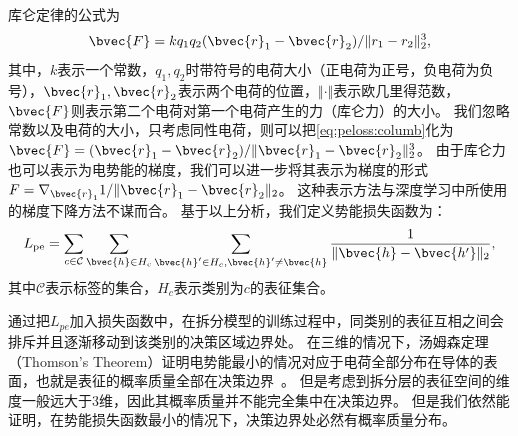 库仑定律的公式为
\begin{equation}
\label{eq:peloss:columb}
    \bvec{F} =  k {q_1q_2(\bvec{r}_1 - \bvec{r}_2)}/{\Vert r_1 - r_2 \Vert_2^3},
\end{equation}
其中，$k$表示一个常数，$q_1, q_2$时带符号的电荷大小（正电荷为正号，负电荷为负号），$\bvec{r}_1, \bvec{r}_2$表示两个电荷的位置，$\Vert \cdot \Vert$表示欧几里得范数，$\bvec{F}$则表示第二个电荷对第一个电荷产生的力（库仑力）的大小。
%
我们忽略常数以及电荷的大小，只考虑同性电荷，则可以把\autoref{eq:peloss:columb}化为$\bvec{F} = (\bvec{r}_1 - \bvec{r}_2) / \Vert\bvec{r}_1 - \bvec{r}_2 \Vert_2^3$。
%
由于库仑力也可以表示为电势能的梯度，我们可以进一步将其表示为梯度的形式$F = \nabla_{\bvec{r}_1} 1/\Vert \bvec{r}_1 - \bvec{r}_2 \Vert_2$。
%
这种表示方法与深度学习中所使用的梯度下降方法不谋而合。
%
基于以上分析，我们定义势能损失函数为：
\begin{equation}
    L_\text{pe} = \sum\limits_{c\in\mathcal C}\sum\limits_{\bvec{h} \in H_c}\sum\limits_{\bvec{h}' \in H_c, \bvec{h}' \ne \bvec{h}} \dfrac{1}{\Vert \bvec{h} - \bvec{h'} \Vert_2},
\end{equation}
其中$\mathcal C$表示标签的集合，$H_c$表示类别为$c$的表征集合。


通过把$L_{pe}$加入损失函数中，在拆分模型的训练过程中，同类别的表征互相之间会排斥并且逐渐移动到该类别的决策区域边界处。
%
在三维的情况下，汤姆森定理（Thomson's Theorem）证明电势能最小的情况对应于电荷全部分布在导体的表面，也就是表征的概率质量全部在决策边界~\cite{griffiths2005introduction}。
%
但是考虑到拆分层的表征空间的维度一般远大于3维，因此其概率质量并不能完全集中在决策边界。
但是我们依然能证明，在势能损失函数最小的情况下，决策边界处必然有概率质量分布。

